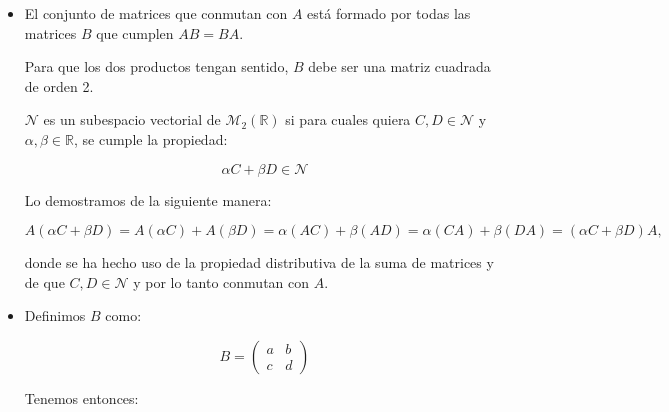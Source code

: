 \begin{itemize}[$\bullet$]
    \item El conjunto de matrices que conmutan con $A$ está formado por todas las matrices $B$ que cumplen $AB = BA$.

    Para que los dos productos tengan sentido, $B$ debe ser una matriz cuadrada de orden 2.

    $\mathcal{N}$ es un subespacio vectorial de $\mathcal{M}_2(\mathbb{R})$ si
    para cuales quiera $C, D \in \mathcal{N}$ y $\alpha, \beta \in \mathbb{R}$, se cumple la propiedad:

    \begin{equation*}
        \alpha C + \beta D \in \mathcal{N}
    \end{equation*}

    Lo demostramos de la siguiente manera:

    \begin{equation*}
        A (\alpha C + \beta D) = A (\alpha C) + A (\beta D) = \alpha (AC) + \beta (AD) = \alpha (CA) + \beta (DA) = (\alpha C + \beta D)A,
    \end{equation*}

    donde se ha hecho uso de la propiedad distributiva de la suma de matrices y de que $C,D \in \mathcal{N}$ y por lo tanto conmutan con $A$.


    \vspace{20px}

    \item Definimos $B$ como:

    \begin{equation*}
        B =
        \begin{pmatrix}
            a & b \\
            c & d
        \end{pmatrix}
    \end{equation*}

    Tenemos entonces:


\end{itemize}
